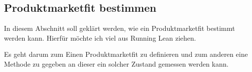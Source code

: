 \subsection{Produktmarketfit bestimmen}

In diesem Abschnitt soll geklärt werden, wie ein Produktmarketfit bestimmt werden kann. Hierfür möchte ich viel aus Running Lean ziehen.

Es geht darum zum Einen Produktmarketfit zu definieren und zum anderen eine Methode zu gegeben an dieser ein solcher Zustand gemessen werden kann.